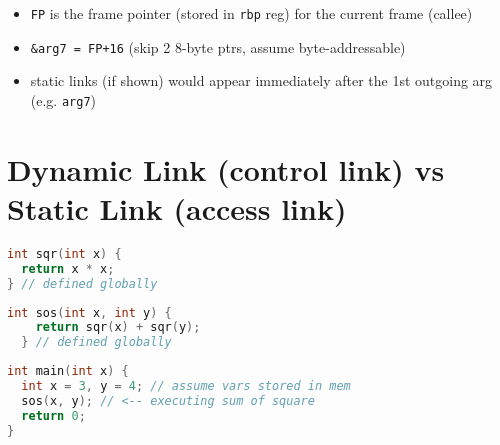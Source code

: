 \documentclass[10pt,a4paper,landscape]{article}
\begin{document}
\begin{multicols*}{3}
\begin{minipage}{.5\linewidth}
\end{minipage}
\begin{minipage}{.5\linewidth}
  \flushleft
  \begin{itemize}
  \item \texttt{FP} is the frame pointer (stored in \texttt{rbp} reg) for the current frame (callee)
  \item \texttt{\&arg7 = FP+16} (skip 2 8-byte ptrs, assume byte-addressable)
  \item static links (if shown) would appear immediately after the 1st outgoing arg (e.g. \texttt{arg7})
\end{itemize}
\end{minipage}
\section*{Dynamic Link (control link) vs Static Link (access link)}
\begin{minipage}{.5\linewidth}
\begin{lstlisting}[language=c]
int sqr(int x) {
  return x * x;
} // defined globally
\end{lstlisting}
\end{minipage}
\begin{minipage}{.5\linewidth}
\begin{lstlisting}[language=c,xrightmargin=2pt]
  int sos(int x, int y) {
    return sqr(x) + sqr(y);
  } // defined globally
\end{lstlisting}
\end{minipage}
\begin{lstlisting}[language=c]
int main(int x) {
  int x = 3, y = 4; // assume vars stored in mem
  sos(x, y); // <-- executing sum of square
  return 0;
}
\end{lstlisting}
\begin{minipage}{\linewidth}
  \centering
\end{minipage}
\end{multicols*}
\end{document}
